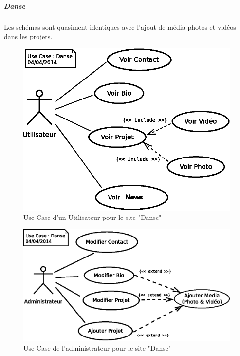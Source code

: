 \documentclass[11pt,a4paper,twoside]{report}
\begin{document}
					\subparagraph*{Danse}Les schémas sont quasiment identiques avec l'ajout de média photos et vidéos dans les projets.
						\begin{figure}[H]
							\centering
							\includegraphics[width=12cm]{UseCase-Danse-User.eps}
							\caption[Use Case Utilisateur Danse]{Use Case d'un Utilisateur pour le site "Danse"}
							\label{fig:UseCase-Danse User}
						\end{figure}
						\begin{figure}[H]
							\centering
							\includegraphics[width=16cm]{UseCase-Danse-Administrateur.eps}
							\caption[Use Case Administrateur Danse]{Use Case de l'administrateur pour le site "Danse"}
							\label{fig:UseCase-Danse Admin}
						\end{figure}
\end{document}
